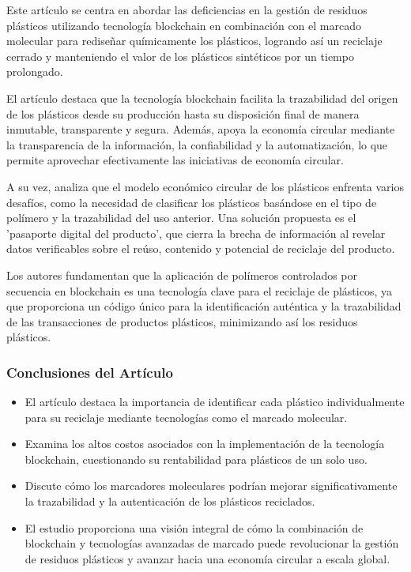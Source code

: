 \documentclass[main.tex]{subfiles}
\begin{document}
Este artículo se centra en abordar las deficiencias en la gestión de residuos plásticos utilizando tecnología blockchain en combinación con el marcado molecular para rediseñar químicamente los plásticos, logrando así un reciclaje cerrado y manteniendo el valor de los plásticos sintéticos por un tiempo prolongado.

El artículo destaca que la tecnología blockchain facilita la trazabilidad del origen de los plásticos desde su producción hasta su disposición final de manera inmutable, transparente y segura. Además, apoya la economía circular mediante la transparencia de la información, la confiabilidad y la automatización, lo que permite aprovechar efectivamente las iniciativas de economía circular.

A su vez, analiza que el modelo económico circular de los plásticos enfrenta varios desafíos, como la necesidad de clasificar los plásticos basándose en el tipo de polímero y la trazabilidad del uso anterior. Una solución propuesta es el 'pasaporte digital del producto', que cierra la brecha de información al revelar datos verificables sobre el reúso, contenido y potencial de reciclaje del producto.

Los autores fundamentan que la aplicación de polímeros controlados por secuencia en blockchain es una tecnología clave para el reciclaje de plásticos, ya que proporciona un código único para la identificación auténtica y la trazabilidad de las transacciones de productos plásticos, minimizando así los residuos plásticos. 

\subsubsection{Conclusiones del Artículo}
\begin{itemize}
    \item El artículo destaca la importancia de identificar cada plástico individualmente para su reciclaje mediante tecnologías como el marcado molecular.
    \item Examina los altos costos asociados con la implementación de la tecnología blockchain, cuestionando su rentabilidad para plásticos de un solo uso.
    \item Discute cómo los marcadores moleculares podrían mejorar significativamente la trazabilidad y la autenticación de los plásticos reciclados.
    \item El estudio proporciona una visión integral de cómo la combinación de blockchain y tecnologías avanzadas de marcado puede revolucionar la gestión de residuos plásticos y avanzar hacia una economía circular a escala global.
\end{itemize}
\end{document}
